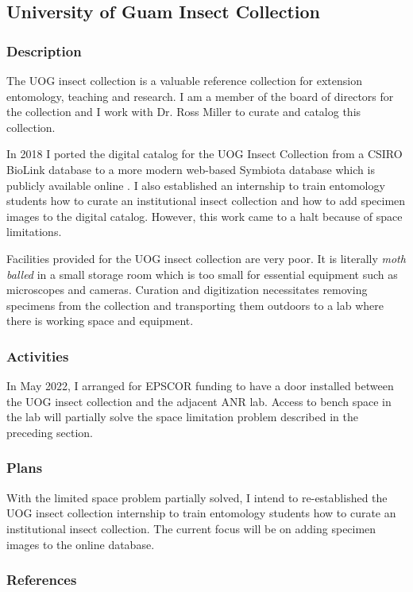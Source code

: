 \subsection{University of Guam Insect Collection}
\begin{refsection}
	
\subsubsection{Description}

The UOG insect collection is a valuable reference collection for extension
entomology, teaching and research. I am a member of the board of directors
for the collection and I work with Dr. Ross Miller to curate and catalog
this collection.

In 2018 I ported the digital catalog for the UOG Insect Collection from a
CSIRO BioLink database to a more modern web-based Symbiota database
which is publicly available online \cite{moore_scan_2018}. I also established an internship to train entomology students how to curate an institutional insect collection and how to add specimen images to the digital catalog\cite{moore_internship_2018}. However, this work came to a halt because of space limitations. 

Facilities provided for the UOG insect collection are very poor. It is literally \textit{moth balled} in a small storage room which is too small for essential equipment such as microscopes and cameras. Curation and digitization necessitates removing specimens from the collection and transporting them outdoors to a lab where there is working space and equipment.

\subsubsection{Activities}

In May 2022, I arranged for EPSCOR funding to have a door installed between the UOG insect collection and the adjacent ANR lab. Access to bench space in the lab will partially solve the space limitation problem described in the preceding section. 


\subsubsection{Plans}

With the limited space problem partially solved, I intend to re-established the UOG insect collection internship to train entomology students how to curate an institutional insect collection.
The current focus will be on adding specimen images to the online database.

\subsubsection{References}
\printbibliography[heading=none]
\end{refsection}

